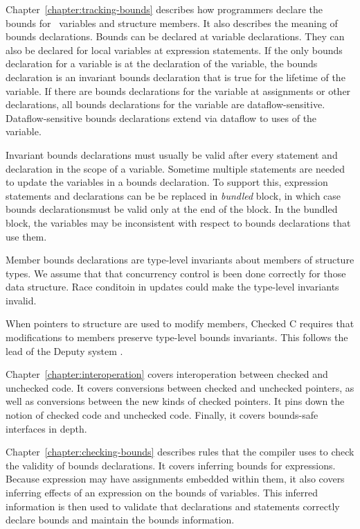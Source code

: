 Chapter~\ref{chapter:tracking-bounds} describes how programmers declare the bounds for
\arrayptr\ variables and structure members. It also describes the meaning of bounds declarations.
Bounds can be declared at variable declarations. They can also be
declared for local variables at expression statements. If the only
bounds declaration for a variable is at the declaration of the variable,
the bounds declaration is an invariant bounds declaration that is true 
for the lifetime of the variable. If there are bounds declarations for the
variable at assignments or other declarations, all bounds declarations for the variable are
dataflow-sensitive. Dataflow-sensitive bounds declarations extend via
dataflow to uses of the variable.

Invariant bounds declarations must usually be valid after every
statement and declaration in the scope of a variable. Sometime multiple
statements are needed to update the variables in a bounds
declaration.
To support this, expression statements and
declarations can be be replaced in \emph{bundled} block, in which
case bounds declarationsmust be valid only at the end of the block.
In the bundled block, the variables may be inconsistent with respect to
bounds declarations that use them. 

Member bounds declarations are type-level invariants about members
of structure types. We assume that that concurrency control is
been done correctly for those data structure.  Race conditoin in
updates could make the type-level invariants invalid.

When pointers to structure are used to modify members, Checked C requires
that modifications to members preserve type-level bounds invariants.
This follows the lead of the Deputy system \cite{Condit2007}.

Chapter~\ref{chapter:interoperation} covers interoperation between
checked and unchecked code. It covers conversions between checked and
unchecked pointers, as well as conversions between the new kinds of checked pointers.
It pins down the notion of checked code  and unchecked code. Finally, it covers
bounds-safe interfaces in depth.

Chapter~\ref{chapter:checking-bounds} describes rules that the compiler uses to check the validity
of bounds declarations. It covers inferring bounds for expressions.
Because expression may have assignments embedded within them, it also
covers inferring effects of an expression on the bounds of variables.
This inferred information is then used to validate that declarations and
statements correctly declare bounds and maintain the bounds information.

